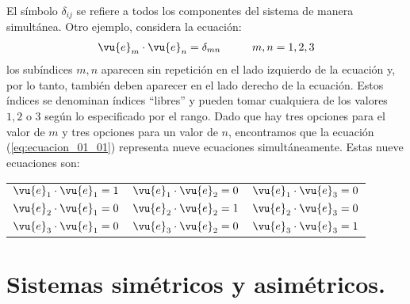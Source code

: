 El símbolo $\delta_{ij}$ se refiere a todos los componentes del sistema de manera simultánea. Otro ejemplo, considera la ecuación:
\begin{align}
\vu{e}_{m} \cdot \vu{e}_{n} = \delta_{mn} \hspace{1cm} m, n = 1, 2, 3
\label{eq:ecuacion_01_01}
\end{align}
los subíndices $m, n$ aparecen sin repetición en el lado izquierdo de la ecuación y, por lo tanto, también deben aparecer en el lado derecho de la ecuación. Estos índices se denominan índices \enquote{libres} y pueden tomar cualquiera de los valores $1, 2$ o $3$ según lo especificado por el rango. Dado que hay tres opciones para el valor de $m$ y tres opciones para un valor de $n$, encontramos que la ecuación (\ref{eq:ecuacion_01_01}) representa nueve ecuaciones simultáneamente. Estas nueve ecuaciones son:
\begin{table}[H]
\large
\centering
\begin{tabular}{c c c}
$\vu{e}_{1} \cdot \vu{e}_{1} = 1$ & $\vu{e}_{1} \cdot \vu{e}_{2} = 0$ & $\vu{e}_{1} \cdot \vu{e}_{3} = 0$ \\
$\vu{e}_{2} \cdot \vu{e}_{1} = 0$ & $\vu{e}_{2} \cdot \vu{e}_{2} = 1$ & $\vu{e}_{2} \cdot \vu{e}_{3} = 0$ \\
$\vu{e}_{3} \cdot \vu{e}_{1} = 0$ & $\vu{e}_{3} \cdot \vu{e}_{2} = 0$ & $\vu{e}_{3} \cdot \vu{e}_{3} = 1$
\end{tabular}
\end{table}
\section{Sistemas simétricos y asimétricos.}

